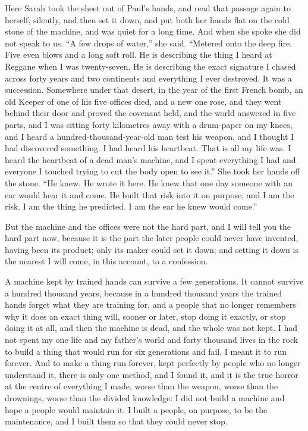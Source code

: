 \ornament

Here Sarah took the sheet out of Paul's hands, and read that passage again to herself, silently, and then set it down, and put both her hands flat on the cold stone of the machine, and was quiet for a long time. And when she spoke she did not speak to us. ``A few drops of water,'' she said. ``Metered onto the deep fire. Five even blows and a long soft roll. He is describing the thing I heard at Reggane when I was twenty-seven. He is describing the exact signature I chased across forty years and two continents and everything I ever destroyed. It was a succession. Somewhere under that desert, in the year of the first French bomb, an old Keeper of one of his five offices died, and a new one rose, and they went behind their door and proved the covenant held, and the world answered in five parts, and I was sitting forty kilometres away with a drum-paper on my knees, and I heard a hundred-thousand-year-old man test his weapon, and I thought I had discovered something. I had heard his heartbeat. That is all my life was. I heard the heartbeat of a dead man's machine, and I spent everything I had and everyone I touched trying to cut the body open to see it.'' She took her hands off the stone. ``He knew. He wrote it here. He knew that one day someone with an ear would hear it and come. He built that risk into it on purpose, and I am the risk. I am the thing he predicted. I am the ear he knew would come.''\par

\ornament

But the machine and the offices were not the hard part, and I will tell you the hard part now, because it is the part the later people could never have invented, having been its product; only its maker could set it down; and setting it down is the nearest I will come, in this account, to a confession.\par

A machine kept by trained hands can survive a few generations. It cannot survive a hundred thousand years, because in a hundred thousand years the trained hands forget what they are training for, and a people that no longer remembers why it does an exact thing will, sooner or later, stop doing it exactly, or stop doing it at all, and then the machine is dead, and the whole was not kept. I had not spent my one life and my father's world and forty thousand lives in the rock to build a thing that would run for six generations and fail. I meant it to run forever. And to make a thing run forever, kept perfectly by people who no longer understand it, there is only one method, and I found it, and it is the true horror at the centre of everything I made, worse than the weapon, worse than the drownings, worse than the divided knowledge: I did not build a machine and hope a people would maintain it. I built a people, on purpose, to be the maintenance, and I built them so that they could never stop.\par

